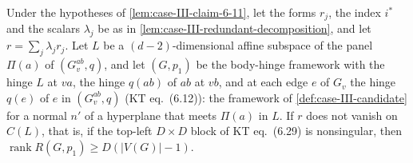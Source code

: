 \begin{lemma}
  \label{lem:case-III-candidate-row}
  \leanok
  Under the hypotheses of \cref{lem:case-III-claim-6-11}, let the forms
  $r_j$, the index $i^*$ and the scalars $\lambda_j$ be as in
  \cref{lem:case-III-redundant-decomposition}, and let
  $r = \sum_j \lambda_j r_j$. Let $L$ be a $(d-2)$-dimensional affine
  subspace of the panel $\Pi(a)$ of $(G_v^{ab}, q)$, and let $(G, p_1)$
  be the body-hinge framework with the hinge $L$ at $va$, the hinge
  $q(ab)$ of $ab$ at $vb$, and at each edge $e$ of $G_v$ the hinge $q(e)$
  of $e$ in $(G_v^{ab}, q)$ (KT eq.~(6.12)): the framework of
  \cref{def:case-III-candidate} for a normal $n'$ of a hyperplane that
  meets $\Pi(a)$ in $L$. If $r$ does not vanish on $C(L)$, that is, if
  the top-left $D \times D$ block of KT eq.~(6.29) is nonsingular, then
  $\operatorname{rank} R(G, p_1) \ge D(|V(G)| - 1)$.
\end{lemma}
